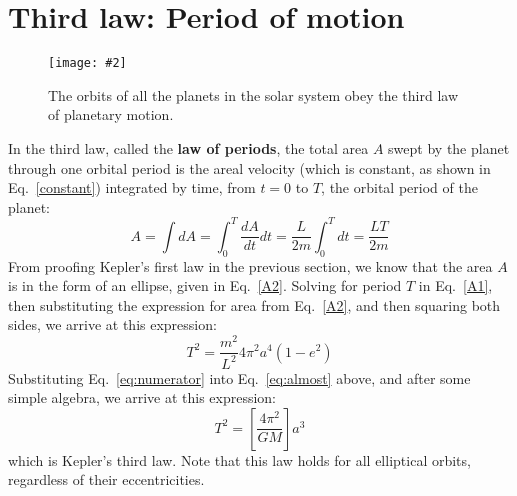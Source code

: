 \documentclass{../../../oss-handout}
\newcommand{\pic}[2]{\texttt{[image: \#2]}}
\begin{document}
\section{Third law: Period of motion}
\begin{figure}[!ht]
  \centering
  \pic{.55}{../kep8.png}
  \caption{The orbits of all the planets in the solar system obey the third
  law of planetary motion.}
  \label{3rdlaw}
\end{figure}
In the third law, called the \textbf{law of periods}, the total area $A$
swept by the planet through one orbital period is the areal velocity (which is
constant, as shown in Eq.\ \ref{constant}) integrated by time, from $t=0$ to
$T$, the orbital period of the planet:
\begin{equation}
  A=\int dA=\int_0^T\frac{dA}{dt}dt=\frac{L}{2m}\int_0^Tdt=\frac{LT}{2m}
  \label{A1}
\end{equation}
From proofing Kepler's first law in the previous section, we know that the
area $A$ is in the form of an ellipse, given in Eq.~\ref{A2}. Solving for
period $T$ in Eq.~\ref{A1}, then substituting the expression for area from
Eq.~\ref{A2}, and then squaring both sides, we arrive at this expression:
\begin{equation}
  T^2=\frac{m^2}{L^2}4\pi^2a^4(1-e^2)
  \label{eq:almost}
\end{equation}
Substituting Eq.~\ref{eq:numerator}
into Eq.\ \ref{eq:almost} above, and after some simple algebra, we arrive at
this expression:
\begin{equation}
  \boxed{T^2=\left[\frac{4\pi^2}{GM}\right] a^3}
\end{equation}
which is Kepler's third law. Note that this law holds for all elliptical
orbits, regardless of their eccentricities.
\end{document}
